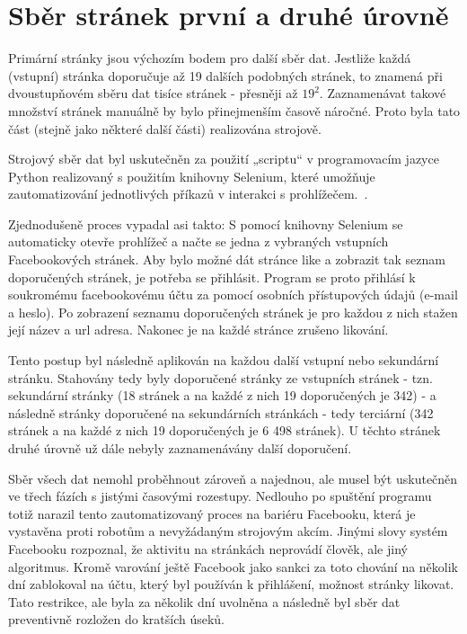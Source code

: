 \section{Sběr stránek první a druhé úrovně}
\label{sec:sber-prvni-druha-uroven}
    Primární stránky jsou výchozím bodem pro další sběr dat. Jestliže každá (vstupní) stránka doporučuje až 19 dalších podobných stránek, to znamená při dvoustupňovém sběru dat tisíce stránek - přesněji až $19^2$. Zaznamenávat takové množství stránek manuálně by bylo přinejmenším časově náročné. Proto byla tato část (stejně jako některé další části) realizována strojově. 
    
    Strojový sběr dat byl uskutečněn za použití „scriptu“ v programovacím jazyce Python realizovaný s použitím knihovny Selenium, které umožňuje zautomatizování jednotlivých příkazů v interakci s prohlížečem.~\citep{pypi}. 
    
    Zjednodušeně proces vypadal asi takto: S pomocí knihovny Selenium se automaticky otevře prohlížeč a načte se jedna z vybraných vstupních Facebookových stránek. Aby bylo možné dát stránce like a zobrazit tak seznam doporučených stránek, je potřeba se přihlásit. Program se proto přihlásí k soukromému facebookovému účtu za pomocí osobních přístupových údajů (e-mail a heslo). Po zobrazení seznamu doporučených stránek je pro každou z nich stažen její název a url adresa. Nakonec je na každé stránce zrušeno likování. 
    
    Tento postup byl následně aplikován na každou další vstupní nebo sekundární stránku. Stahovány tedy byly doporučené stránky ze vstupních stránek - tzn. sekun\-dární stránky (18 stránek a na každé z nich 19 doporučených je 342) - a následně stránky doporučené na sekundárních stránkách - tedy terciární (342 stránek a na každé z nich 19 doporučených je 6 498 stránek). U těchto stránek druhé úrovně už dále nebyly zaznamenávány další doporučení. 
    
    Sběr všech dat nemohl proběhnout zároveň a najednou, ale musel být uskuteč\-něn ve třech fázích s jistými časovými rozestupy. Nedlouho po spuštění programu totiž narazil tento zautomatizovaný proces na bariéru Facebooku, která je vystavěna proti robotům a nevyžádaným strojovým akcím. Jinými slovy systém Facebooku rozpoznal, že aktivitu na stránkách neprovádí člověk, ale jiný algoritmus. Kromě varování ještě Facebook jako sankci za toto chování na několik dní zablokoval na účtu, který byl používán k přihlášení, možnost stránky likovat. Tato restrikce, ale byla za několik dní uvolněna a následně byl sběr dat preventivně rozložen do kratších úseků. 
    
